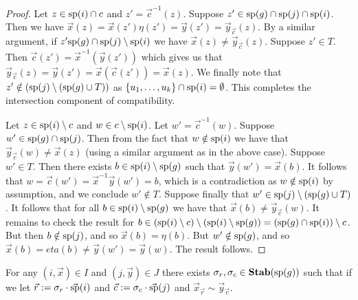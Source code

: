 \documentclass[../paper.tex]{subfiles}
\begin{document}
\begin{proof}
  Let $z \in \text{sp}(i) \cap c$ and $z' = \vec{c}^{-1}(z)$. Suppose $z' \in
  \text{sp}(g)\cap \text{sp}(j) \cap \text{sp}(i)$. Then we have $\vec{x}(z) =
  \vec{x}(z') \eta (z') = \vec{y}(z') = \vec{y}_{\vec{c}}(z)$. By a similar
  argument, if $z' \text{sp}(g) \cap \text{sp}(j) \setminus \text{sp}(i)$ we have
  $\vec{x}(z) \neq \vec{y}_{\vec{c}}(z)$. Suppose $z' \in T$. Then $\vec{c}(z')
  = \vec{x}^{-1}(\vec{y}(z'))$ which gives us that $\vec{y}_{\vec{c}}(z) =
  \vec{y}(z') = \vec{x}(\vec{c}(z')) = \vec{x}(z)$. We finally note that $z'
  \notin (\text{sp}(j) \setminus (\text{sp}(g) \cup T))$ as $\{u_1 , \ldots , u_k\}
  \cap \text{sp}(i) = \emptyset$. This completes the intersection component of
  compatibility.

  Let $z \in \text{sp}(i) \setminus c$ and $w \in c \setminus \text{sp}(i)$. Let $w' =
  \vec{c}^{-1}(w)$. Suppose $w' \in \text{sp}(g) \cap \text{sp}(j)$. Then from the
  fact that $w \notin \text{sp}(i)$ we have that $\vec{y}_{\vec{c}}(w) \neq
  \vec{x}(z)$ (using a similar argument as in the above case). Suppose $w' \in
  T$. Then there exists $b \in \text{sp}(i) \setminus \text{sp}(g)$ such that
  $\vec{y}(w') = \vec{x}(b)$. It follows that $w = \vec{c}(w') =
  \vec{x}^{-1}\vec{y} (w') = b$, which is a contradiction as $w \notin
  \text{sp}(i)$ by assumption, and we conclude $w' \notin T$. Suppose finally that
  $w' \in \text{sp}(j) \setminus (\text{sp}(g) \cup T)$. It follows that for all $b
  \in \text{sp}(i) \setminus \text{sp}(g)$ we have that $\vec{x}(b) \neq
  \vec{y}_{\vec{c}}(w)$. It remains to check the result for $b \in (\text{sp}(i)
  \setminus c) \setminus (\text{sp}(i) \setminus \text{sp}(g)) = (\text{sp}(g) \cap
  \text{sp}(i)) \setminus c$. But then $b \notin \text{sp}(j)$, and so $\vec{x}(b) =
  \eta (b)$. But $w' \notin \text{sp}(g)$, and so $\vec{x}(b) = eta(b) \neq
  \vec{y}(w') = \vec{y}(w)$. The result follows.
\end{proof}

\begin{lem}
  \label{lem:permutation_row-column}
  For any $(i, \vec{x}) \in I$ and $(j, \vec{y}) \in J$ there exists $\sigma_r,
  \sigma_c \in \text{\textbf{Stab}} (\text{sp} (g))$ such that if we let $\vec{r} := \sigma_r \cdot
  \vec{\text{sp}}(i)$ and $\vec{c} := \sigma_c \cdot \vec{\text{sp}}(j)$ and
  $\vec{x}_{\vec{r}} \sim \vec{y}_{\vec{c}}$.
\end{lem}
\end{document}
